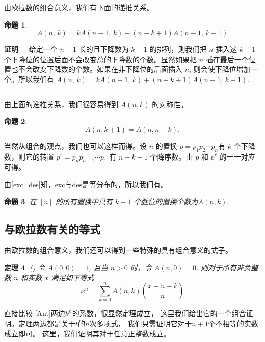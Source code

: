 \documentclass[a4paper,11pt]{article}
\newtheorem{thm}{定理}[section]
\newtheorem{prop}[thm]{命题}
\def\qed{\nopagebreak\hfill{\rule{4pt}{7pt}}\medbreak}
\def\pf{{\bf 证明~~ }}
\def \des{\mathrm{des}}
\def \exc{\mathrm{exc}}
\begin{document}
由欧拉数的组合意义，我们有下面的递推关系。

\begin{prop}\label{p1}
\begin{equation}
A(n,\,k)=kA(n-1,\, k)+(n-k+1)A(n-1,\,k-1)
\end{equation}
\end{prop}

\pf 给定一个 $n-1$ 长的且下降数为 $k-1$ 的排列，则我们把 $n$ 插入这
$k-1$ 个下降位的位置后面不会改变总的下降数的个数。显然如果把 $n$
插在最后一个位置也不会改变下降数的个数。如果在非下降位的后面插入
$n$, 则会使下降位增加一个。所以我们有 $A(n,\,k)=kA(n-1,\,
k)+(n-k+1)A(n-1,\,k-1).$ \qed

由上面的递推关系，我们很容易得到 $A(n,k)$ 的对称性。
\begin{prop}
\begin{equation}
A(n,k+1)=A(n,n-k).
\end{equation}
\end{prop}

当然从组合的观点，我们也可以这样而得。设 $n$ 的置换 $p=p_{1}p_{2}
\cdots p_n$有 $k$ 个下降数，则它的转置 $p^r=p_{n}p_{n-1}\cdots p_1$
有 $n-k-1$ 个降序数。由 $p$ 和 $p^r$ 的一一对应可得。

由\ref{exc_des}知，$\exc$与$\des$是等分布的，所以我们有。
\begin{prop}
在 $[n]$ 的所有置换中具有 $k-1$ 个胜位的置换个数为$A(n,k)$.
\end{prop}


\subsection{与欧拉数有关的等式}
由欧拉数的组合意义，我们还可以得到一些特殊的具有组合意义的式子。
\begin{thm}\label{t1}(\cite{Graham1994})
令 $A(0,0)=1$, 且当 $n>0$ 时，令 $A(n,0)=0$. 则对于所有非负整数 $n$
和实数 $x$ 满足如下等式
\begin{equation}\label{sm}
x^n=\sum_{k=0}^{n}A(n,k){x+n-k \choose n}
\end{equation}
\end{thm}

直接比较 \eqref{Ant}两边$k^n$的系数，很显然定理成立，
这里我们给出它的一个组合证明。定理两边都是关于$t$的$n$次多项式，
我们只需证明它对于$n+1$个不相等的实数成立即可。
这里，我们证明其对于任意正整数成立。
\end{document}
